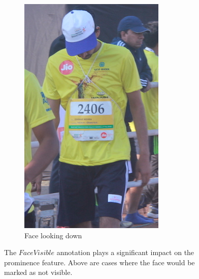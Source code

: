 \begin{figure}[p]
\begin{subfigure}[b]{0.25\textwidth}
    \includegraphics[width=\textwidth]{images/dataset/Prominence_FaceNotVisible_LookingDown}
    \caption{Face looking down}
  \end{subfigure}
  \hspace{\fill}
  \caption[Face visibility and its effect on prominence]{The $FaceVisible$ annotation plays a significant impact on the prominence feature. Above are cases where the face would be marked as not visible.}
  \label{fig:dataset:face_prominence}
\end{figure}

